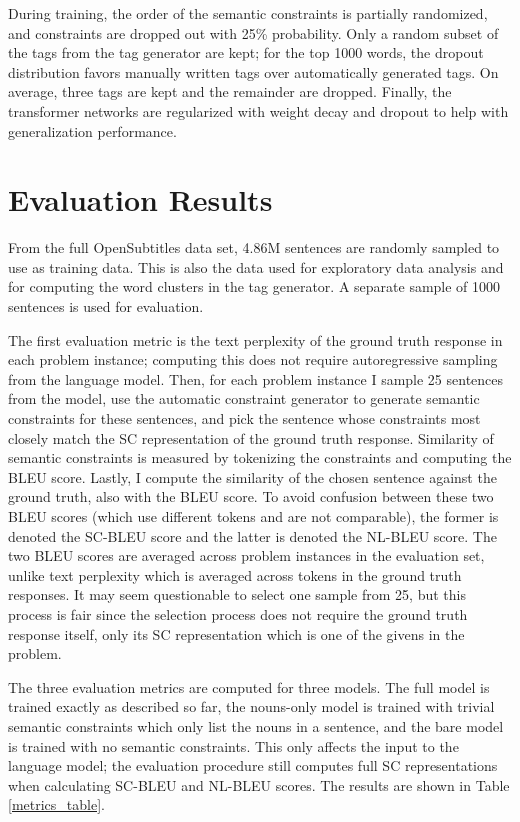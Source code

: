 \documentclass{article}
\numberwithin{equation}{section}
\begin{document}
During training, the order of the semantic constraints is partially randomized, and constraints are dropped out with 25\% probability. Only a random subset of the tags from the tag generator are kept; for the top 1000 words, the dropout distribution favors manually written tags over automatically generated tags. On average, three tags are kept and the remainder are dropped. Finally, the transformer networks are regularized with weight decay and dropout to help with generalization performance.

\section{Evaluation Results}

From the full OpenSubtitles data set, 4.86M sentences are randomly sampled to use as training data. This is also the data used for exploratory data analysis and for computing the word clusters in the tag generator. A separate sample of 1000 sentences is used for evaluation.

The first evaluation metric is the text perplexity of the ground truth response in each problem instance; computing this does not require autoregressive sampling from the language model. Then, for each problem instance I sample 25 sentences from the model, use the automatic constraint generator to generate semantic constraints for these sentences, and pick the sentence whose constraints most closely match the SC representation of the ground truth response. Similarity of semantic constraints is measured by tokenizing the constraints and computing the BLEU score. Lastly, I compute the similarity of the chosen sentence against the ground truth, also with the BLEU score. To avoid confusion between these two BLEU scores (which use different tokens and are not comparable), the former is denoted the SC-BLEU score and the latter is denoted the NL-BLEU score. The two BLEU scores are averaged across problem instances in the evaluation set, unlike text perplexity which is averaged across tokens in the ground truth responses. It may seem questionable to select one sample from 25, but this process is fair since the selection process does not require the ground truth response itself, only its SC representation which is one of the givens in the problem.

The three evaluation metrics are computed for three models. The full model is trained exactly as described so far, the nouns-only model is trained with trivial semantic constraints which only list the nouns in a sentence, and the bare model is trained with no semantic constraints. This only affects the input to the language model; the evaluation procedure still computes full SC representations when calculating SC-BLEU and NL-BLEU scores. The results are shown in Table \ref{metrics_table}.
\end{document}
